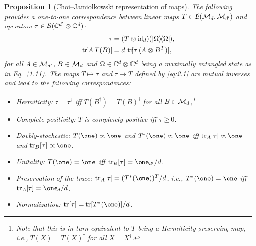 \documentclass[11pt,a4paper]{article}
\numberwithin{equation}{section}
\theoremstyle{plain}
\newtheorem{proposition}{Proposition}[section]
\theoremstyle{definition}
\begin{document}
\begin{proposition}[Choi--Jamiolkowski representation of maps]
    The following provides a one-to-one correspondence between linear maps
    $T \in \mathcal{B}(\mathcal{M}_d,\mathcal{M}_{d'})$ and operators $\tau \in \mathcal{B}(\mathbb{C}^{d'}\otimes \mathbb{C}^{d})$:
    \begin{equation}\label{eq:2.1}
        \begin{aligned}
            \tau           & = (T \otimes \mathrm{id}_d)(|\Omega\rangle\!\langle\Omega|), \\
            \operatorname{tr}\![A\,T(B)] & = d\,\operatorname{tr}\![\tau\,(A \otimes B^{T})],
        \end{aligned}
    \end{equation}
    for all $A \in \mathcal{M}_{d'}$, $B \in \mathcal{M}_d$ and $\Omega \in \mathbb{C}^d\otimes \mathbb{C}^d$
    being a maximally entangled state as in Eq.~(1.11). The maps $T \mapsto \tau$ and
    $\tau \mapsto T$ defined by \eqref{eq:2.1} are mutual inverses and lead to the
    following correspondences:
    \begin{itemize}
        \item Hermiticity: $\tau = \tau^\dagger$ iff $T(B^\dagger)=T(B)^\dagger$ for all
              $B \in \mathcal{M}_d$,\footnote{Note that this is in turn equivalent to $T$ being a
                  Hermiticity preserving map, i.e., $T(X)=T(X)^\dagger$ for all $X=X^\dagger$.}
        \item Complete positivity: $T$ is completely positive iff $\tau \ge 0$.
        \item Doubly-stochastic: $T(\one)\propto\one$ and $T^*(\one)\propto\one$ iff
              $\tr_A[\tau]\propto \one$ and $\tr_B[\tau]\propto \one$.
        \item Unitality: $T(\one)=\one$ iff $\tr_B[\tau]=\one_{d'}/d$.
        \item Preservation of the trace: $\tr_A[\tau] = (T^*(\one))^{T}/d$,
              i.e., $T^*(\one)=\one$ iff $\tr_A[\tau]=\one_d/d$.
        \item Normalization: $\tr[\tau]=\tr[T^*(\one)]/d$.
    \end{itemize}
\end{proposition}
\end{document}
